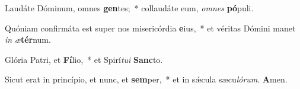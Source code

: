 \item Laudáte Dóminum, omnes \textbf{gen}tes;~* collaudáte eum, \textit{omnes} \textbf{pó}puli.

\item Quóniam confirmáta est super nos misericórdia \textbf{e}ius,~* et véritas Dómini manet \textit{in} \textit{æ}\textbf{tér}num.

\item Glória Patri, et \textbf{Fí}lio,~* et Spirí\textit{tui} \textbf{Sanc}to.

\item Sicut erat in princípio, et nunc, et \textbf{sem}per,~* et in sǽcula sæcu\textit{lórum}. \textbf{A}men.